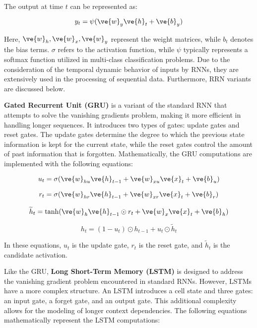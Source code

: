 The output at time $t$ can be represented as:

\begin{equation}
y_t = \psi(\ve{w}_{y}\ve{h}_t + \ve{b}_y)
\end{equation}

Here, $\ve{w}_{h}, \ve{w}_{x}, \ve{w}_{y}$ represent the weight matrices, while $b_t$ denotes the bias terms. $\sigma$ refers to the activation function, while $\psi$ typically represents a softmax function utilized in multi-class classification problems. Due to the consideration of the temporal dynamic behavior of inputs by RNNs, they are extensively used in the processing of sequential data. Furthermore, RRN variants are discussed  below.

\textbf{Gated Recurrent Unit (GRU)} is a variant of the standard RNN that attempts to solve the vanishing gradients problem, making it more efficient in handling longer sequences. It introduces two types of gates: update gates and reset gates. The update gates determine the degree to which the previous state information is kept for the current state, while the reset gates control the amount of past information that is forgotten. Mathematically, the GRU computations are implemented with the following equations:

\begin{equation}
u_t = \sigma(\ve{w}_{hu}\ve{h}_{t-1} + \ve{w}_{xu}\ve{x}_t + \ve{b}_u)
\end{equation}

\begin{equation}
r_t = \sigma(\ve{w}_{hr}\ve{h}_{t-1} + \ve{w}_{xr}\ve{x}_t + \ve{b}_r)
\end{equation}

\begin{equation}
\widetilde{h}_t = \tanh(\ve{w}_{h}\ve{h}_{t-1}\odot r_t + \ve{w}_{x}\ve{x}_t + \ve{b}_h)
\end{equation}

\begin{equation}
h_t = (1 - u_t) \odot h_{t-1} + u_t \odot \widetilde{h}_t
\end{equation}

In these equations, $u_t$ is the update gate, $r_t$ is the reset gate, and $\widetilde{h}_t$ is the candidate activation.

Like the GRU, \textbf{Long Short-Term Memory (LSTM)} is designed to address the vanishing gradient problem encountered in standard RNNs. However, LSTMs have a more complex structure. An LSTM introduces a cell state and three gates: an input gate, a forget gate, and an output gate. This additional complexity allows for the modeling of longer context dependencies. The following equations mathematically represent the LSTM computations:

